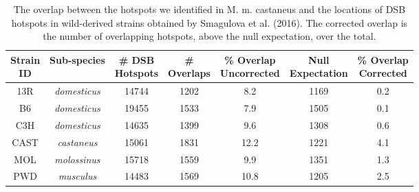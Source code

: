 

\begin{table}
\caption{The overlap between the hotspots we identified in M. m. castaneus and the locations of DSB hotspots in wild-derived strains obtained by Smagulova et al. (2016). The corrected overlap is the number of overlapping hotspots, above the null expectation, over the total.}
\begin{tabular} {c c c c c c c} \\ [ 0.5ex ] \hline

\makecell{Strain\\ID} & Sub-species & \makecell{\# DSB \\ Hotspots} & \makecell{\# \\ Overlaps} & \makecell{\% Overlap \\ Uncorrected} & \makecell{Null \\Expectation} & \makecell{\% Overlap \\ Corrected}\\ \hline
13R & \emph{domesticus} & 14744 & 1202 & 8.2 & 1169 & 0.2 \\
B6 & \emph{domesticus}& 19455 & 1533 & 7.9 & 1505 & 0.1 \\ 
C3H & \emph{domesticus} & 14635 & 1399 & 9.6 & 1308 & 0.6 \\
CAST & \emph{castaneus} & 15061 & 1831 & 12.2 & 1221 & 4.1 \\
MOL & \emph{molossinus} & 15718 & 1559 & 9.9 & 1351 & 1.3 \\
PWD & \emph{musculus} & 14483 & 1569 & 10.8 & 1205 & 2.5 \\ \hline


\end{tabular}
\end{table}
